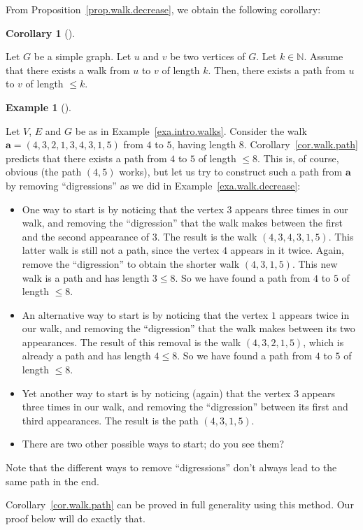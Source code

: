 \documentclass[numbers=enddot,12pt,final,onecolumn,notitlepage]{scrartcl}%
\theoremstyle{definition}
\newtheorem{coro}[theo]{Corollary}
\newenvironment{corollary}[1][]
{\begin{coro}[#1]\begin{leftbar}}
{\end{leftbar}\end{coro}}
\newtheorem{exam}[theo]{Example}
\newenvironment{example}[1][]
{\begin{exam}[#1]\begin{leftbar}}
{\end{leftbar}\end{exam}}
\newcommand{\NN}{\mathbb{N}}
\newcommand{\tup}[1]{\left( #1 \right)}
\begin{document}
From Proposition~\ref{prop.walk.decrease}, we obtain the following
corollary:

\begin{corollary} \label{cor.walk.path}
Let $G$ be a simple graph. Let $u$ and $v$ be two vertices of $G$.
Let $k \in \NN$.
Assume that there exists a walk from $u$ to $v$ of length $k$.
Then, there exists a path from $u$ to $v$ of length $\leq k$.
\end{corollary}

\begin{example} \label{exa.walk.path}
Let $V$, $E$ and $G$ be as in Example~\ref{exa.intro.walks}. Consider
the walk $\mathbf{a} = \tup{4, 3, 2, 1, 3, 4, 3, 1, 5}$ from $4$ to
$5$, having length $8$. Corollary~\ref{cor.walk.path} predicts that
there exists a path from $4$ to $5$ of length $\leq 8$. This is, of
course, obvious (the path $\tup{4, 5}$ works), but let us try to
construct such a path from $\mathbf{a}$ by removing ``digressions''
as we did in Example~\ref{exa.walk.decrease}:

\begin{itemize}
\item One way to start is by noticing that the vertex $3$ appears
  three times in our walk, and removing the ``digression'' that the
  walk makes between the first and the second appearance of $3$. The
  result is the walk $\tup{4, 3, 4, 3, 1, 5}$. This latter walk is
  still not a path, since the vertex $4$ appears in it twice. Again,
  remove the ``digression'' to obtain the shorter walk
  $\tup{4, 3, 1, 5}$. This new walk is a path and has length
  $3 \leq 8$. So we have found a path from $4$ to $5$ of length
  $\leq 8$.
\item An alternative way to start is by noticing that the vertex $1$
  appears twice in our walk, and removing the ``digression'' that the
  walk makes between its two appearances. The result of this removal
  is the walk $\tup{4, 3, 2, 1, 5}$, which is already a path and has
  length $4 \leq 8$. So we have found a path from $4$ to $5$ of length
  $\leq 8$.
\item Yet another way to start is by noticing (again) that the vertex
  $3$ appears three times in our walk, and removing the ``digression''
  between its first and third appearances. The result is the path
  $\tup{4, 3, 1, 5}$.
\item There are two other possible ways to start; do you see them?
\end{itemize}

Note that the different ways to remove ``digressions'' don't always
lead to the same path in the end.

Corollary~\ref{cor.walk.path} can be proved in full generality using
this method. Our proof below will do exactly that.
\end{example}
\end{document}
